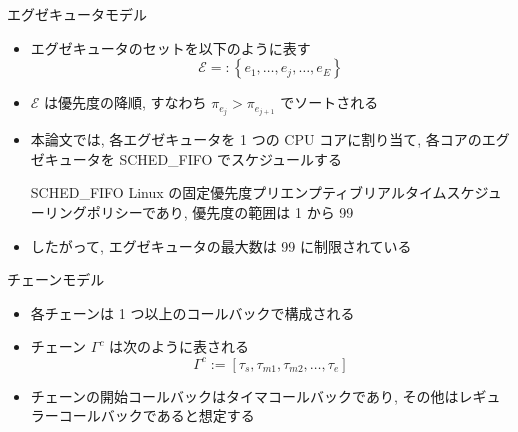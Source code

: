 \begin{frame}{エグゼキュータモデル}
    \begin{itemize}
        \item エグゼキュータのセットを以下のように表す
              \vspace{-2mm}
              \begin{equation*}
                  \mathcal{E}=:\left\{e_{1}, \ldots, e_{j}, \ldots, e_{E}\right\}
              \end{equation*}

        \item $\mathcal{E}$ は優先度の降順, すなわち $\pi_{e_{j}}>\pi_{e_{j+1}}$ でソートされる
        \item 本論文では, 各エグゼキュータを 1 つの CPU コアに割り当て, 各コアのエグゼキュータを SCHED\_FIFO でスケジュールする
              \begin{block}{SCHED\_FIFO}
                  Linux の固定優先度プリエンプティブリアルタイムスケジューリングポリシーであり, 優先度の範囲は 1 から 99
              \end{block}
              \vspace{5mm}
        \item したがって, エグゼキュータの最大数は 99 に制限されている
    \end{itemize}
\end{frame}

\begin{frame}{チェーンモデル}
    \begin{itemize}
        \item 各チェーンは 1 つ以上のコールバックで構成される
        \item チェーン $\Gamma^{c}$ は次のように表される
              \vspace{-2mm}
              \begin{equation*}
                  \Gamma^{c}:=\left[\tau_{s}, \tau_{m 1}, \tau_{m 2}, \ldots, \tau_{e}\right]
              \end{equation*}
        \item チェーンの開始コールバックはタイマコールバックであり, その他はレギュラーコールバックであると想定する
    \end{itemize}
\end{frame}

